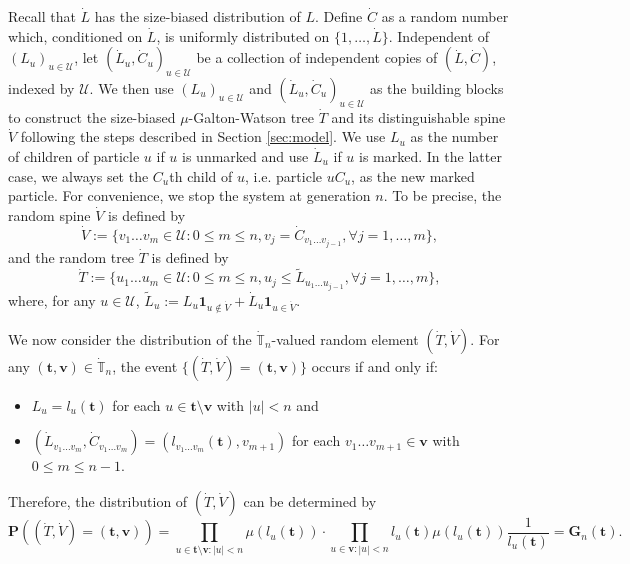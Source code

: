 \documentclass[12pt,a4paper]{amsart}
\numberwithin{equation}{section}
\begin{document}
	Recall that $\dot L$ has the size-biased distribution of $L$.
	Define $\dot C$ as a random number which, conditioned on $\dot L$, is uniformly distributed on $\{1,\dots,\dot L\}$.
	Independent of $(L_u)_{u\in\mathcal U}$, let $(\dot L_u,\dot C_u)_{u\in \mathcal U}$ be a collection of independent copies of $(\dot L,\dot C)$, indexed by $\mathcal U$.
	We then use $(L_u)_{u\in\mathcal U}$ and $(\dot L_u,\dot C_u)_{u\in\mathcal U}$ as the building blocks to construct the size-biased $\mu$-Galton-Watson tree $\dot T$ and its distinguishable spine $\dot V$ following the steps described in Section \ref{sec:model}.
	We use $L_u$ as the number of children of particle $u$ if $u$ is unmarked and use $\dot L_u$ if $u$ is marked.
	In the latter case, we always set the $C_u$th child of $u$, i.e. particle $uC_u$, as the new marked particle.
	For convenience, we stop the system at generation $n$. To be precise, the random spine $\dot V$ is defined by
\begin{equation*}
		\dot V
	:=
		\{v_1\dots v_m\in \mathcal U:0\le m\le n, v_j=\dot C_{v_1\dots v_{j-1}},\forall j=1,\dots,m\},
\end{equation*}
	and the random tree $\dot T$ is defined by
\begin{equation*}
		\dot T
	:=
		\{u_1\dots u_m\in\mathcal U: 0\le m\le n,u_j\leq \tilde L_{u_1\dots u_{j-1}},\forall j=1,\dots,m\},
\end{equation*}
	where, for any $u\in\mathcal U$, $\tilde L_u:=L_u\mathbf 1_{u\not\in \dot V}+\dot L_u\mathbf 1_{u\in \dot V}$.

	We now consider the distribution of the $\dot{\mathbb T}_n$-valued random element $(\dot T,\dot V)$.
	For any $( \mathbf t , \mathbf v)\in\dot{\mathbb T}_n$, the event $\{(\dot T,\dot V)=( \mathbf t , \mathbf v)\}$ occurs if and only if:
\begin{itemize}
\item
    $L_u=l_u( \mathbf t )$ for each $u\in  \mathbf t \setminus \mathbf v$ with $| u |<n$ and
\item
	$(\dot L_{v_1\dots v_m},\dot C_{v_1\dots v_m})=(l_{v_1\dots v_m}( \mathbf t ),v_{m+1})$ for each $v_1\dots v_{m+1}\in \mathbf v$ with $0\le m\le n-1$.
\end{itemize}
    Therefore, the distribution of $(\dot T,\dot V)$ can be determined by
\begin{equation}
\label{eq:treespinemeasure}
		\mathbf P((\dot T,\dot V)=( \mathbf t , \mathbf v))
	=
		\prod_{u\in  \mathbf t \setminus \mathbf v:|u|<n}\mu(l_u( \mathbf t ))
	\cdot
		\prod_{u\in  \mathbf v:| u| <n}l_u( \mathbf t )\mu(l_u( \mathbf t ))\frac{1}{l_u( \mathbf t )}
	=
		\mathbf G_n( \mathbf t ).
\end{equation}
	
\end{document}
